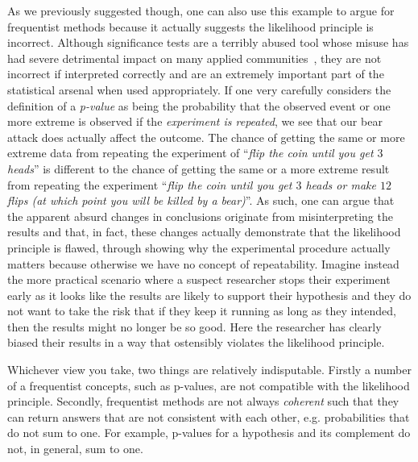 As we previously suggested though, one can also use this example to argue for frequentist methods because it actually
suggests the likelihood principle is incorrect.  Although significance tests are a terribly abused tool whose misuse has had
severe detrimental impact on many applied communities~\citep{goodman1999toward,ioannidis2005most}, they are not incorrect if 
interpreted correctly
and are an extremely important part of the statistical arsenal when used appropriately.  If one very carefully considers
the definition of a \emph{p-value} as being the probability that the observed event or one more extreme is observed if the
\emph{experiment is repeated}, we see that our bear attack does actually affect the outcome.  The chance of getting the same
or more extreme data from repeating the experiment of ``\textit{flip the coin until you get $3$ heads}'' is different to 
the chance of getting the same or a more extreme result from repeating the experiment 
``\textit{flip the coin until you get $3$ heads or make $12$ flips (at which point you will be killed by a bear)}''.  
As such, one can argue that the apparent absurd
changes in conclusions originate from misinterpreting the results and that, in fact, these changes actually demonstrate
that the likelihood principle is flawed, through showing why the experimental procedure actually matters because otherwise
we have no concept of repeatability.  Imagine instead the more practical scenario where a suspect researcher stops their experiment
early as it looks like the results are likely to support their hypothesis and they do not want to take the risk that if they
keep it running as long as they intended, then the results might no longer be so good.  Here the researcher has clearly
biased their results in a way that ostensibly violates the likelihood principle.

Whichever view you take, two things are relatively indisputable.  Firstly a number of a frequentist concepts, such as p-values,
are not compatible with the likelihood principle.  Secondly, frequentist methods are not always \emph{coherent} such that they can
return answers that are not consistent with each other, e.g. probabilities that do not sum to one.  For example, p-values
for a hypothesis and its complement do not, in general, sum to one.  

